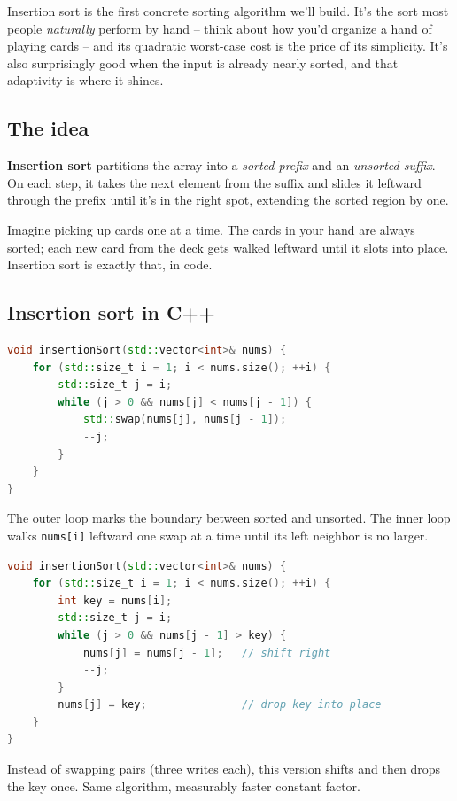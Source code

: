 \documentclass[11pt]{article}
\begin{document}
Insertion sort is the first concrete sorting algorithm we'll build.
It's the sort most people \emph{naturally} perform by hand -- think
about how you'd organize a hand of playing cards -- and its
quadratic worst-case cost is the price of its simplicity. It's also
surprisingly good when the input is already nearly sorted, and that
adaptivity is where it shines.

\subsection{The idea}

\begin{defnbox}
\textbf{Insertion sort} partitions the array into a \emph{sorted
prefix} and an \emph{unsorted suffix}. On each step, it takes the
next element from the suffix and slides it leftward through the
prefix until it's in the right spot, extending the sorted region by
one.
\end{defnbox}

\begin{ideabox}
Imagine picking up cards one at a time. The cards in your hand are
always sorted; each new card from the deck gets walked leftward
until it slots into place. Insertion sort is exactly that, in code.
\end{ideabox}

\subsection{Insertion sort in C++}

\begin{examplebox}
\begin{lstlisting}[basicstyle=\ttfamily\small,frame=single,language=C++]
void insertionSort(std::vector<int>& nums) {
    for (std::size_t i = 1; i < nums.size(); ++i) {
        std::size_t j = i;
        while (j > 0 && nums[j] < nums[j - 1]) {
            std::swap(nums[j], nums[j - 1]);
            --j;
        }
    }
}
\end{lstlisting}
The outer loop marks the boundary between sorted and unsorted. The
inner loop walks \texttt{nums[i]} leftward one swap at a time until
its left neighbor is no larger.
\end{examplebox}

\begin{examplebox}
\begin{lstlisting}[basicstyle=\ttfamily\small,frame=single,language=C++]
void insertionSort(std::vector<int>& nums) {
    for (std::size_t i = 1; i < nums.size(); ++i) {
        int key = nums[i];
        std::size_t j = i;
        while (j > 0 && nums[j - 1] > key) {
            nums[j] = nums[j - 1];   // shift right
            --j;
        }
        nums[j] = key;               // drop key into place
    }
}
\end{lstlisting}
Instead of swapping pairs (three writes each), this version shifts
and then drops the key once. Same algorithm, measurably faster
constant factor.
\end{examplebox}
\end{document}
